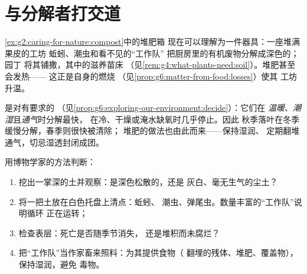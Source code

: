 \section{与分解者打交道}

\begin{example}[堆肥，终于讲清楚]\label{ex:g6:decomposers-and-soil:compost}
\cref{ex:g2:caring-for-nature:compost}中的堆肥箱
现在可以理解为一件器具：一座堆满果皮的工坊
蚯蚓、潮虫和看不见的“工作队”
把厨房里的有机废物分解成深色的；园丁
将其铺撒，其中的滋养苗床
（见\cref{rem:g4:what-plants-need:soil}）。堆肥甚至会发热——
这正是自身的燃烧
（见\cref{prop:g6:matter-from-food:losses}）使其
工坊升温。
\end{example}

\begin{proposition}[影响分解快慢的因素]\label{prop:g6:decomposers-and-soil:speed}
是对有要求的
（见\cref{prop:g6:exploring-our-environment:decide}）：它们在
\emph{温暖}、\emph{潮湿}且\emph{通气}时分解最快，
在冷、干燥或淹水缺氧时几乎停止。因此
秋季落叶在冬季缓慢分解，春季则很快被清除；
堆肥的做法也由此而来——保持湿润、
定期翻堆通气，切忌湿透封闭成团。
\end{proposition}
\admitted

\begin{method}[判断土壤健康状况]\label{met:g6:decomposers-and-soil:read}
用博物学家的方法判断：
\begin{enumerate}
  \item 挖出一掌深的土并观察：是深色松散的，还是
        灰白、毫无生气的尘土？
  \item 将一把土放在白色托盘上清点：蚯蚓、
        潮虫、弹尾虫。数量丰富的“工作队”说明循环
        正在运转；
  \item 检查表层：死亡是否随季节消失，
        还是堆积而未腐烂？
  \item 把“工作队”当作家畜来照料：为其提供食物（
        翻埋的残体、堆肥、覆盖物），保持湿润，避免
        毒物。
\end{enumerate}
\end{method}

